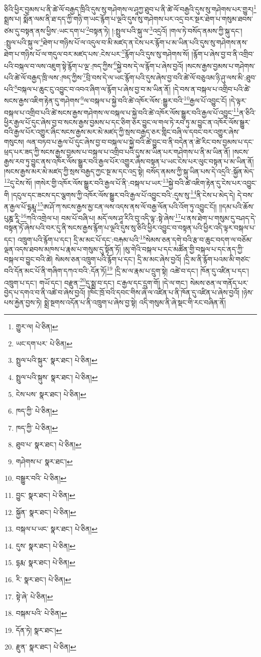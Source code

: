 ཅིའི་ཕྱིར་བྱམས་པ་ནི་ཚེ་ལོ་བརྒྱད་ཁྲིའི་དུས་སུ་གཤེགས་ལ་ཤཱཀྱ་ཐུབ་པ་ནི་ཚེ་ལོ་བརྒྱའི་དུས་སུ་གཤེགས་པར་གྱུར།\footnote{གྱུར་ལ།  པེ་ཅིན། } སྨྲས་པ། སྨོན་ལམ་ནི་ཐ་དད་ཀྱི་གཉི་ག་ཡང་རྙོག་པ་ལྔའི་དུས་སུ་གཤེགས་པར་འདྲ་བར་སྔར་ཐེག་པ་གསུམ་ཐབས་ཙམ་དུ་བསྟན་ནས་ཕྱིས་:ཡང་དག་པ་\footnote{ཡང་དག་པར་  པེ་ཅིན། }བསྟན་ཏེ། །:སྤྲུལ་པའི་སྐུ་ལ་\footnote{སྤྲུལ་པའི་སྐུར་  སྣར་ཐང་།  པེ་ཅིན། }འདྲའོ། །གལ་ཏེ་བསོད་ནམས་ཀྱི་སྐུ་དང་། :སྤྲུལ་པའི་སྐུ་ལ་\footnote{སྤྲུལ་པའི་སྐུས་  སྣར་ཐང་།  པེ་ཅིན། }ཐེག་པ་གཉིས་པོ་ལ་འདུལ་བ་མི་མཛད་ན་ངེས་པར་རྙོག་པ་མ་ཡིན་པའི་དུས་སུ་གཤེགས་ནས་ཐེག་པ་གཉིས་པོ་ལ་གདུལ་བར་མཛད་པས་:ངེས་པར་\footnote{ངེས་པས་  སྣར་ཐང་།  པེ་ཅིན། }རྙོག་པའི་དུས་སུ་གཤེགས་སོ། །རྙོག་པ་ཞེས་བྱ་བ་ནི་འགྲིབ་པའི་བསྐལ་བ་ལས་འཇུག་སྟེ་རྙོག་པ་ལྔ་:ཁད་ཀྱིས་\footnote{ཁད་ཀྱི་  པེ་ཅིན། }སྐྱེ་བས་དེ་ལ་རྙོག་པ་ཞེས་བྱའོ། །སངས་རྒྱས་བྱམས་པ་གཤེགས་པའི་ཚེ་ལོ་བརྒྱད་ཁྲི་ལས་:ཁད་ཀྱིས་\footnote{ཁད་ཀྱི་  པེ་ཅིན། }བྲི་བས་དེ་ལ་ཡང་རྙོག་པའི་དུས་ཞེས་བྱ་བའི་ཚེ་ལོ་བཅུའམ་ཉི་ཤུ་ལས་མི་:ཐུབ་པའི་\footnote{ཐུབ་པ་  སྣར་ཐང་།  པེ་ཅིན། }བསྐལ་པ་ཆུང་ངུ་འབྱུང་བ་འབའ་ཞིག་ལ་རྙོག་པ་ཞེས་བྱ་བ་མ་ཡིན་ནོ། །དེ་བས་ན་བསྐལ་པ་འགྲིབ་པའི་ཚེ་སངས་རྒྱས་འཇིག་རྟེན་དུ་གཤེགས་\footnote{གཤེགས་པ་  སྣར་ཐང་། }ལ་བསྐལ་པ་སྐྱེ་བའི་ཚེ་འཁོར་ལོས་:སྒྱུར་བའི་\footnote{བསྒྱུར་བའི་  པེ་ཅིན། }རྒྱལ་པོ་འབྱུང་ངོ། །དེ་ལྟར་བསྐལ་པ་འགྲིབ་པའི་ཚེ་སངས་རྒྱས་གཤེགས་ལ་བསྐལ་པ་སྐྱེ་བའི་ཚེ་འཁོར་ལོས་སྒྱུར་བའི་རྒྱལ་པོ་འབྱུང་\footnote{བྱུང་  སྣར་ཐང་།  པེ་ཅིན། }ན་ཅིའི་ཕྱིར་རྒྱལ་པོ་དུང་ཞེས་བྱ་བ་སངས་རྒྱས་བྱམས་པ་དང་ཅིག་ཅར་བྱུང་ལ་གལ་ཏེ་རབ་ཏུ་མ་བྱུང་ན་འཁོར་ལོས་སྒྱུར་བའི་རྒྱལ་པོར་འགྱུར་ཞིང་སངས་རྒྱས་མར་མེ་མཛད་ཀྱི་སྲས་བརྒྱད་ཅར་གླིང་བཞི་ལ་དབང་བར་འགྱུར་ཞེས་གསུངས། ལན་བཏབ་པ་རྒྱལ་པོ་དུང་ཞེས་བྱ་བ་བསྐལ་པ་སྐྱེ་བའི་ཚེ་བྱུང་བ་ནི་བདེན་ན་ཚེ་རིང་བས་བྱམས་པ་དང་ཕྲད་པར་ཟད་ཀྱི་སངས་རྒྱས་བྱམས་པ་བསྐལ་པ་འགྲིབ་པའི་དུས་མ་ཡིན་པར་གཤེགས་པ་ནི་མ་ཡིན་ནོ། །སངས་རྒྱས་རབ་ཏུ་བྱུང་ནས་འཁོར་ལོས་སྒྱུར་བའི་རྒྱལ་པོར་འགྱུར་ཞེས་བསྟན་པ་ཡང་ངེས་པར་ལུང་བསྟན་པ་མ་ཡིན་ནོ། །སངས་རྒྱས་མར་མེ་མཛད་ཀྱི་སྲས་བརྒྱད་ཀྱང་སྔ་མ་དང་འདྲ་སྟེ། བསོད་ནམས་ཀྱི་སྐུ་ཡིན་པས་དེ་འདྲའི་:སྐྱོན་མེད་\footnote{སྐྱོན་  སྣར་ཐང་།  པེ་ཅིན། }དུ་ངེས་སོ། །གསེར་གྱི་འཁོར་ལོས་སྒྱུར་བའི་རྒྱལ་པོ་ནི་:བསྐལ་པ་ཡར་\footnote{བསྐལ་པ་ཡང་  སྣར་ཐང་།  པེ་ཅིན། }སྐྱེ་བའི་ཚེ་འཇིག་རྟེན་དུ་ངེས་པར་འབྱུང་གི །དངུལ་དང་ཟངས་དང་ལྕགས་ཀྱི་འཁོར་ལོས་སྒྱུར་བའི་རྒྱལ་པོ་འབྱུང་བའི་:དུས་སུ་\footnote{དུས་  སྣར་ཐང་།  པེ་ཅིན། }ནི་ངེས་པ་མེད་དེ། དེ་བས་ན་རྒྱལ་པོ་དྷརྨཱ་\footnote{དྷརྨ་  སྣར་ཐང་།  པེ་ཅིན། }ཨ་ཤོ་ཀ་སངས་རྒྱས་མྱ་ངན་ལས་འདས་ནས་ལོ་བརྒྱ་ལོན་པའི་འོག་ཏུ་འབྱུང་ངོ།། །།དམ་པའི་ཆོས་པུཎྜ་རཱི་\footnote{རི་  སྣར་ཐང་།  པེ་ཅིན། }ཀའི་འགྲེལ་པ། བམ་པོ་བཞི་པ། མདོ་ལས་ཤཱ་རིའི་བུ་འདི་ལྟ་:སྟེ་ཞེས་\footnote{སྟེ་ཞེ་  པེ་ཅིན། }པ་ནས་ཐེག་པ་གསུམ་དུ་བཤད་དེ་བསྟན་ཏོ་ཞེས་པའི་བར་དུ་ནི་སངས་རྒྱས་རྙོག་པ་ལྔའི་དུས་སུ་ཅིའི་ཕྱིར་འབྱུང་བ་བསྟན་པའི་ཕྱིར་འདི་ལྟར་བསྐལ་པ་དང་། འཁྲུག་པའི་རྙོག་པ་དང་། དྲི་མ་མང་པོ་དང་:བརྐམ་པའི་\footnote{བསྐམ་པའི་  པེ་ཅིན། }སེམས་ཅན་དགེ་བའི་རྩ་བ་ཆུང་བདག་ལ་བཅོམ་ལྡན་འདས་ཐབས་མཁས་པ་རྣམ་པ་གསུམ་དུ་སྟོན་ཏོ། །མུ་གེའི་བསྐལ་པ་དང་མཚོན་གྱི་བསྐལ་པ་དང་ནད་ཀྱི་བསྐལ་བ་བྱུང་བའི་ཚེ། སེམས་ཅན་འཁྲུག་པའི་རྙོག་པ་དང་། དྲི་མ་མང་ཞེས་བྱའོ། །དྲི་མ་ནི་རྙོག་པའམ་མི་གཙང་བའི་དོན་མང་པོ་ནི་གཞིག་དཀའ་བའི་:དོན་ཏོ།\footnote{དོན་ཏེ།  སྣར་ཐང་། } །དྲི་མ་ལ་རྣམ་པ་དྲུག་སྟེ། འཚེ་བ་དང་། ཁོན་དུ་འཛིན་པ་དང་། འཁྲུག་པ་དང་། གཡོ་དང་། བརྫུན་\footnote{རྫུན་  སྣར་ཐང་།  པེ་ཅིན། }དུ་སྨྲ་བ་དང་། ང་རྒྱལ་དང་དྲུག་གོ། །དེ་ལ་གང་། སེམས་ཅན་ལ་གནོད་པར་བྱེད་པ་དགའ་བ་ནི་འཚེ་བ་ཞེས་བྱའོ། །ཁོང་ཁྲོ་བའི་དབང་གིས་ཞེ་ལ་འཛིན་པ་ནི་ཁོན་དུ་འཛིན་པ་ཞེས་བྱའོ། །ཉེས་པས་རྐྱེན་བྱས་ཏེ། སྨྲེ་སྔགས་འདོན་པ་ནི་འཁྲུག་པ་ཞེས་བྱ་སྟེ། འདི་གསུམ་ནི་ཞེ་སྡང་གི་རང་བཞིན་ནོ། 